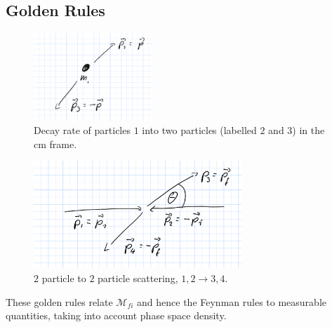 \subsection{Golden Rules}
\begin{figure}
\centering
\includegraphics[width=0.4\textwidth]{fig/weak/Decay122}
\caption{Decay rate of particles $1$ into two particles (labelled $2$ and $3$) in the cm frame.\label{fig:Decay122}}
\end{figure}
\begin{figure}
\centering
\includegraphics[width=0.7\textwidth]{fig/weak/ScatteringGeneric222}
\caption{$2$ particle to $2$ particle scattering, $1,2 \to 3,4$.\label{fig:ScatteringGeneric222}}
\end{figure}

These golden rules relate $\mathcal{M}_{fi}$ and hence the Feynman rules to measurable quantities, taking into account phase space density. 
